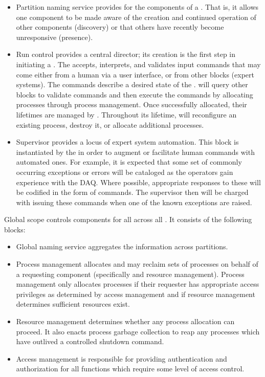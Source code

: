 \begin{itemize}
\item Partition naming service provides  for the components of a . 
  That is, it allows one component to be made aware of the creation and continued operation of other components (discovery) or that others have recently become unresponsive (presence). 

\item Run control provides a central director;  its creation is the first step in initiating a . 
  The  accepts, interprets, and validates input commands that may come either from a human via a user interface, or from other blocks (expert systems). 
  The commands describe a desired state of the . 
   will query other blocks to validate commands and then execute the commands by allocating processes through process management. 
  Once successfully allocated, their lifetimes are managed by . 
  Throughout its lifetime,  will reconfigure an existing process, destroy it, or allocate additional processes. 

\item Supervisor provides a locus of expert system automation. 
  This block is instantiated by the  in order to augment or facilitate human commands with automated ones. 
  For example, it is expected that some set of commonly occurring exceptions or errors will be cataloged as the operators gain experience with the DAQ.   Where possible, appropriate responses to these will be codified in the form of  commands.  The supervisor then will be charged with issuing these commands when one of the known exceptions are raised.

\end{itemize}

Global scope controls  components for all  across all .  It consists of the following blocks:


\begin{itemize}
\item Global naming service aggregates the  information across partitions.  

\item Process management allocates and may reclaim sets of processes on behalf of a requesting component (specifically  and resource management). 
  Process management only allocates processes if their requester has appropriate access privileges as determined by access management and if resource management determines sufficient resources exist. 
  
\item Resource management determines whether any process allocation can proceed.  It also enacts process garbage collection to reap any processes which have outlived a controlled shutdown command.

  
\item Access management is responsible for providing authentication and authorization for all  functions which require some level of access control. 

\end{itemize}

